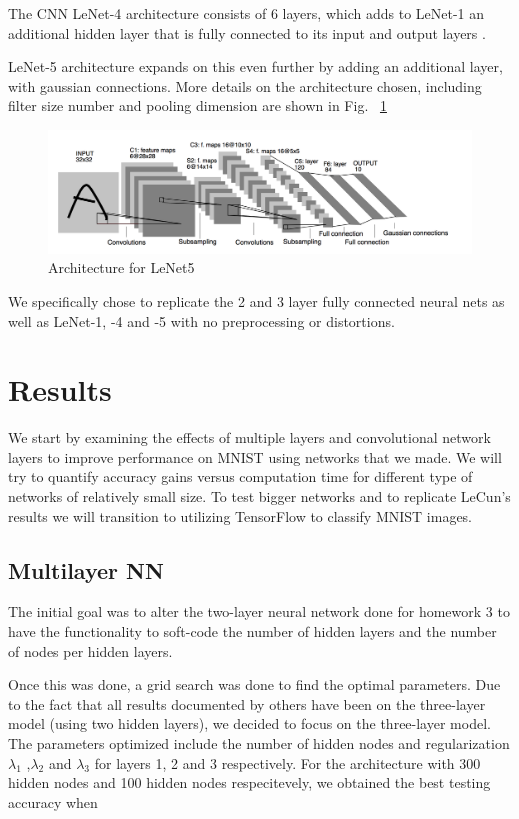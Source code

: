 \documentclass[12pt, twocolumn]{article}
\begin{document}
The CNN LeNet-4 architecture consists of 6 layers, which adds to LeNet-1 an additional hidden layer that is fully connected to its  input and output layers . \cite{LeCun95}

LeNet-5 architecture expands on this even further by adding an additional layer, with gaussian connections. More details on the architecture chosen, including filter size number and pooling dimension are shown in Fig. ~\ref{fig:LeNet5}

 \begin{figure}
\includegraphics[scale=.6]{LeNet5.png}
\caption{Architecture for LeNet5 \cite{LeCun1998}}
\label{fig:LeNet5}
\end{figure}


 We specifically chose to replicate the 2 and 3 layer fully connected neural nets as well as LeNet-1, -4 and -5 with no preprocessing or distortions. 


\section{Results}
We start by examining the effects of multiple layers and convolutional network layers to improve performance on MNIST using networks that we made. We will try to quantify accuracy gains versus computation time for different type of networks of relatively small size. To test bigger networks and to replicate LeCun's results we will transition to utilizing TensorFlow to classify MNIST images. 

\subsection{Multilayer NN}
The initial goal was to alter the two-layer neural network done for homework 3 to have the functionality to soft-code the number of hidden layers and the number of nodes per hidden layers.
\newline

Once this was done, a grid search was done to find the optimal parameters. Due to the fact that all results documented by others have been on the three-layer model (using two hidden layers), we decided to focus on the three-layer model. The parameters optimized include the number of hidden nodes and regularization $\lambda_1$ ,$\lambda_2$ and $\lambda_3$ for layers 1, 2 and 3 respectively.
\newine
For the architecture with 300 hidden nodes and 100 hidden nodes respecitevely, we obtained the best testing accuracy when 
\end{document}
